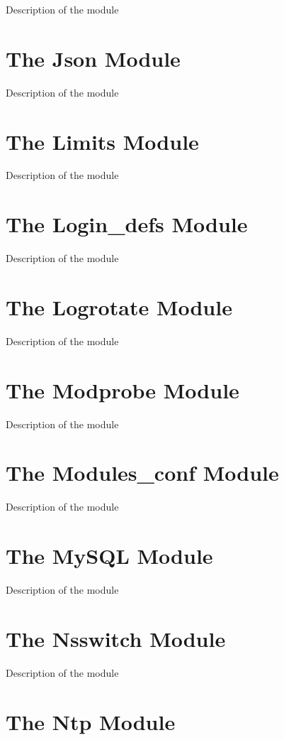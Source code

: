Description of the module

\section{The Json Module}

Description of the module

\section{The Limits Module}

Description of the module

\section{The Login\_defs Module}

Description of the module

\section{The Logrotate Module}

Description of the module

\section{The Modprobe Module}

Description of the module

\section{The Modules\_conf Module}

Description of the module

\section{The MySQL Module}

Description of the module

\section{The Nsswitch Module}

Description of the module

\section{The Ntp Module}

